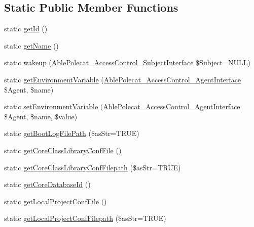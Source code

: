 \subsection*{Static Public Member Functions}
\begin{DoxyCompactItemize}
\item 
static \hyperlink{class_able_polecat___mode___config_acfaa3a96d0cb5a4c0d4d710dcba41e9e}{get\+Id} ()
\item 
static \hyperlink{class_able_polecat___mode___config_a4ef9bd37ba3ce8a13c1e8bcf4f72a630}{get\+Name} ()
\item 
static \hyperlink{class_able_polecat___mode___config_a3f2135f6ad45f51d075657f6d20db2cd}{wakeup} (\hyperlink{interface_able_polecat___access_control___subject_interface}{Able\+Polecat\+\_\+\+Access\+Control\+\_\+\+Subject\+Interface} \$Subject=N\+U\+L\+L)
\item 
static \hyperlink{class_able_polecat___mode___config_a04e7e0f41da8037ae797868b61b6df77}{get\+Environment\+Variable} (\hyperlink{interface_able_polecat___access_control___agent_interface}{Able\+Polecat\+\_\+\+Access\+Control\+\_\+\+Agent\+Interface} \$Agent, \$name)
\item 
static \hyperlink{class_able_polecat___mode___config_a68bdefd00518f09963ea3fa95cd2a242}{set\+Environment\+Variable} (\hyperlink{interface_able_polecat___access_control___agent_interface}{Able\+Polecat\+\_\+\+Access\+Control\+\_\+\+Agent\+Interface} \$Agent, \$name, \$value)
\item 
static \hyperlink{class_able_polecat___mode___config_a98f25f25f60a178ec74bb6d61a2da394}{get\+Boot\+Log\+File\+Path} (\$as\+Str=T\+R\+U\+E)
\item 
static \hyperlink{class_able_polecat___mode___config_aacf69cc3cf05703578df104da8eb0bcd}{get\+Core\+Class\+Library\+Conf\+File} ()
\item 
static \hyperlink{class_able_polecat___mode___config_aa5af30def44e95a5430e8dfeb3a9ad58}{get\+Core\+Class\+Library\+Conf\+Filepath} (\$as\+Str=T\+R\+U\+E)
\item 
static \hyperlink{class_able_polecat___mode___config_a2c846f82f5a9eaf53b91c3044368f90a}{get\+Core\+Database\+Id} ()
\item 
static \hyperlink{class_able_polecat___mode___config_a7ca948548573f53759da0cffe9d091ad}{get\+Local\+Project\+Conf\+File} ()
\item 
static \hyperlink{class_able_polecat___mode___config_a893cd31087f31a29352a8bd2d5c05433}{get\+Local\+Project\+Conf\+Filepath} (\$as\+Str=T\+R\+U\+E)
\item 

\end{DoxyCompactItemize}
